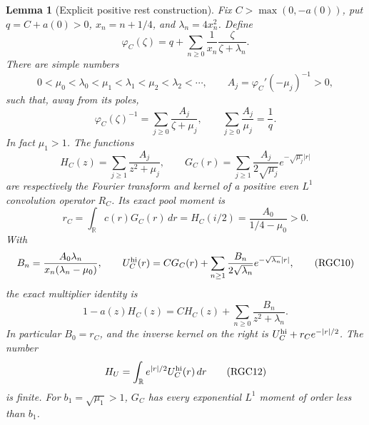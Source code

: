 \documentclass[11pt]{article}
\newtheorem{lemma}[theorem]{Lemma}
\theoremstyle{remark}\newtheorem{remark}[theorem]{Remark}
\begin{document}
\begin{lemma}[Explicit positive rest construction]
\label{lem:rest-regularizer-construction}
Fix \(C>\max(0,-a(0))\), put \(q=C+a(0)>0\),
\(x_n=n+1/4\), and \(\lambda_n=4x_n^2\). Define
\[
 \varphi_C(\zeta)=q+
   \sum_{n\ge0}\frac1{x_n}\frac{\zeta}{\zeta+\lambda_n}.
 \tag{RGC5}
\]
There are simple numbers
\[
 0<\mu_0<\lambda_0<\mu_1<\lambda_1<\mu_2<\lambda_2<\cdots,
 \qquad A_j=\varphi_C'(-\mu_j)^{-1}>0,
 \tag{RGC6}
\]
such that, away from its poles,
\[
 \varphi_C(\zeta)^{-1}
   =\sum_{j\ge0}\frac{A_j}{\zeta+\mu_j},
 \qquad \sum_{j\ge0}\frac{A_j}{\mu_j}=\frac1q.
 \tag{RGC7}
\]
In fact \(\mu_1>1\). The functions
\[
 H_C(z)=\sum_{j\ge1}\frac{A_j}{z^2+\mu_j},\qquad
 G_C(r)=\sum_{j\ge1}\frac{A_j}{2\sqrt{\mu_j}}
                   e^{-\sqrt{\mu_j}|r|}
 \tag{RGC8}
\]
are respectively the Fourier transform and kernel of a positive
even \(L^1\) convolution operator \(R_C\). Its exact pool moment is
\[
 r_C=\int_{\mathbb R}c(r)G_C(r)\,dr
     =H_C(i/2)=\frac{A_0}{1/4-\mu_0}>0.
 \tag{RGC9}
\]
With
\[
 B_n=\frac{A_0\lambda_n}{x_n(\lambda_n-\mu_0)},\qquad
 U_C^{\rm hi}(r)
   =C G_C(r)+\sum_{n\ge1}\frac{B_n}{2\sqrt{\lambda_n}}
                    e^{-\sqrt{\lambda_n}|r|},
 \tag{RGC10}
\]
the exact multiplier identity is
\[
 1-a(z)H_C(z)=
 C H_C(z)+\sum_{n\ge0}\frac{B_n}{z^2+\lambda_n}.
 \tag{RGC11}
\]
In particular \(B_0=r_C\), and the inverse kernel on the right is
\(U_C^{\rm hi}+r_Ce^{-|r|/2}\).
The number
\[
 H_U=\int_{\mathbb R}e^{|r|/2}U_C^{\rm hi}(r)\,dr
 \tag{RGC12}
\]
is finite. For \(b_1=\sqrt{\mu_1}>1\), \(G_C\) has every
exponential \(L^1\) moment of order less than \(b_1\).
\end{lemma}
\end{document}
